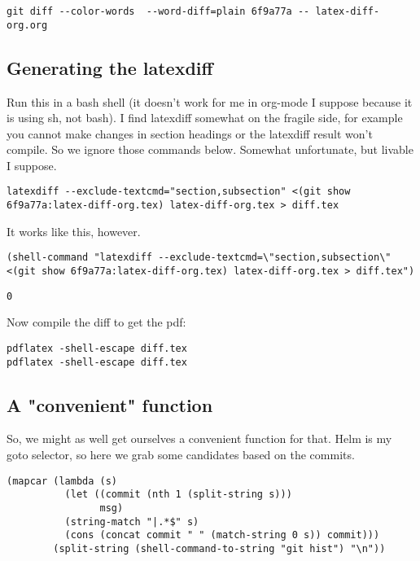 \documentclass[11pt]{article}
\begin{document}
\begin{verbatim}
git diff --color-words  --word-diff=plain 6f9a77a -- latex-diff-org.org
\end{verbatim}

\subsection{Generating the latexdiff}
\label{sec-1-2}

Run this in a bash shell (it doesn't work for me in org-mode I suppose because it is using sh, not bash). I find latexdiff somewhat on the fragile side, for example you cannot make changes in section headings or the latexdiff result won't compile. So we ignore those commands below. Somewhat unfortunate, but livable I suppose.

\begin{verbatim}
latexdiff --exclude-textcmd="section,subsection" <(git show 6f9a77a:latex-diff-org.tex) latex-diff-org.tex > diff.tex
\end{verbatim}

It works like this, however.
\begin{verbatim}
(shell-command "latexdiff --exclude-textcmd=\"section,subsection\" <(git show 6f9a77a:latex-diff-org.tex) latex-diff-org.tex > diff.tex")
\end{verbatim}

\begin{verbatim}
0
\end{verbatim}

Now compile the diff to get the pdf:

\begin{verbatim}
pdflatex -shell-escape diff.tex
pdflatex -shell-escape diff.tex
\end{verbatim}


\subsection{A "convenient" function}
\label{sec-1-3}
So, we might as well get ourselves a convenient function for that. Helm is my goto selector, so here we grab some candidates based on the commits.

\begin{verbatim}
(mapcar (lambda (s)
          (let ((commit (nth 1 (split-string s)))
                msg)
          (string-match "|.*$" s)
          (cons (concat commit " " (match-string 0 s)) commit)))
        (split-string (shell-command-to-string "git hist") "\n"))
\end{verbatim}
\end{document}
